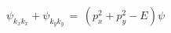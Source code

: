 \begin{equation}
\psi_{k_x k_x} +\psi_{k_y k_y} \, =\, \left( p^2_x + p^2_y -E \right) \psi
\label{eq:laplace}
\end{equation}

